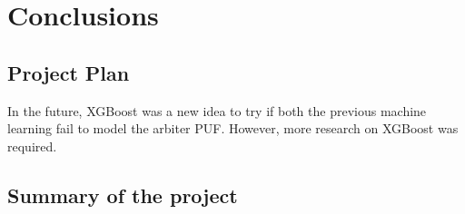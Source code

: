 \chapter{Conclusions}

\section{Project Plan}
In the future, XGBoost was a new idea to try if both the previous machine learning fail to model the arbiter PUF. However, more research on XGBoost was required.

\section{Summary of the project}
